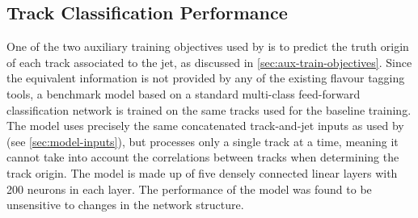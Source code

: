 %



\subsection{Track Classification Performance}\label{sec:gnn_tc_perf}

One of the two auxiliary training objectives used by \GNN is to predict the truth origin of each track associated to the jet, as discussed in \cref{sec:aux-train-objectives}.
Since the equivalent information is not provided by any of the existing flavour tagging tools, a benchmark model based on  a standard multi-class feed-forward classification network is trained on the same tracks used for the baseline \GNN training.
The model uses precisely the same concatenated track-and-jet inputs as used by \GNN (see \cref{sec:model-inputs}), but processes only a single track at a time, meaning it cannot take into account the correlations between tracks when determining the track origin.
The model is made up of five densely connected linear layers with 200 neurons in each layer.
The performance of the model was found to be unsensitive to changes in the network structure. 

